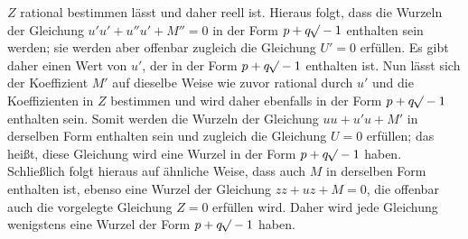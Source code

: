 $Z$ rational bestimmen lässt und daher reell ist. Hieraus folgt, dass die Wurzeln der Gleichung $u'u'+u''u'+M''=0$ in der Form $p+q\mathord{{}^{}\!\surd}-1$ enthalten sein werden; sie werden aber offenbar zugleich die Gleichung $U'=0$ erfüllen. Es gibt daher einen Wert von $u'$, der in der Form $p+q\mathord{{}^{}\!\surd}-1$ enthalten ist. Nun lässt sich der Koeffizient $M'$ auf dieselbe Weise wie zuvor rational durch $u'$ und die Koeffizienten in $Z$ bestimmen und wird daher ebenfalls in der Form $p+q\mathord{{}^{}\!\surd}-1$ enthalten sein. Somit werden die Wurzeln der Gleichung $uu+u'u+M'$ in derselben Form enthalten sein und zugleich die Gleichung $U=0$ erfüllen; das heißt, diese Gleichung wird eine Wurzel in der Form $p+q\mathord{{}^{}\!\surd}-1$ haben. Schließlich folgt hieraus auf ähnliche Weise, dass auch $M$ in derselben Form enthalten ist, ebenso eine Wurzel der Gleichung $zz+uz+M=0$, die offenbar auch die vorgelegte Gleichung $Z=0$ erfüllen wird. Daher wird jede Gleichung wenigstens eine Wurzel der Form $p+q\mathord{{}^{}\!\surd}-1$ haben.

